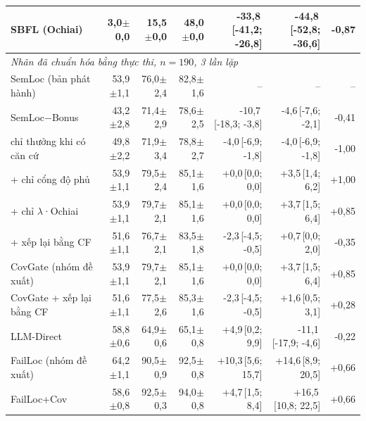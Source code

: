 \begin{tabular}{lrrrrrr}
SBFL (Ochiai) & 3,0{\scriptsize$\pm$0,0} & 15,5{\scriptsize$\pm$0,0} & 48,0{\scriptsize$\pm$0,0} & -33,8{\scriptsize\,[-41,2; -26,8]} & -44,8{\scriptsize\,[-52,8; -36,6]} & -0,87 \\
\midrule
\multicolumn{7}{l}{\emph{Nhãn đã chuẩn hóa bằng thực thi, $n=190$, 3 lần lặp}} \\
SemLoc (bản phát hành) & 53,9{\scriptsize$\pm$1,1} & 76,0{\scriptsize$\pm$2,4} & 82,8{\scriptsize$\pm$1,6} & -- & -- & -- \\
SemLoc−Bonus & 43,2{\scriptsize$\pm$2,8} & 71,4{\scriptsize$\pm$2,9} & 78,6{\scriptsize$\pm$2,5} & -10,7{\scriptsize\,[-18,3; -3,8]} & -4,6{\scriptsize\,[-7,6; -2,1]} & -0,41 \\
\quad chỉ thưởng khi có căn cứ & 49,8{\scriptsize$\pm$2,2} & 71,9{\scriptsize$\pm$3,4} & 78,8{\scriptsize$\pm$2,7} & -4,0{\scriptsize\,[-6,9; -1,8]} & -4,0{\scriptsize\,[-6,9; -1,8]} & -1,00 \\
\quad + chỉ cổng độ phủ & 53,9{\scriptsize$\pm$1,1} & 79,5{\scriptsize$\pm$2,4} & 85,1{\scriptsize$\pm$1,6} & +0,0{\scriptsize\,[0,0; 0,0]} & +3,5{\scriptsize\,[1,4; 6,2]} & +1,00 \\
\quad + chỉ $\lambda$·Ochiai & 53,9{\scriptsize$\pm$1,1} & 79,7{\scriptsize$\pm$2,1} & 85,1{\scriptsize$\pm$1,6} & +0,0{\scriptsize\,[0,0; 0,0]} & +3,7{\scriptsize\,[1,5; 6,4]} & +0,85 \\
\quad + xếp lại bằng CF & 51,6{\scriptsize$\pm$1,1} & 76,7{\scriptsize$\pm$2,1} & 83,5{\scriptsize$\pm$1,8} & -2,3{\scriptsize\,[-4,5; -0,5]} & +0,7{\scriptsize\,[0,0; 2,0]} & -0,35 \\
CovGate (nhóm đề xuất) & 53,9{\scriptsize$\pm$1,1} & 79,7{\scriptsize$\pm$2,1} & 85,1{\scriptsize$\pm$1,6} & +0,0{\scriptsize\,[0,0; 0,0]} & +3,7{\scriptsize\,[1,5; 6,4]} & +0,85 \\
CovGate + xếp lại bằng CF & 51,6{\scriptsize$\pm$1,1} & 77,5{\scriptsize$\pm$2,6} & 85,3{\scriptsize$\pm$1,6} & -2,3{\scriptsize\,[-4,5; -0,5]} & +1,6{\scriptsize\,[0,5; 3,1]} & +0,28 \\
LLM-Direct & 58,8{\scriptsize$\pm$0,6} & 64,9{\scriptsize$\pm$0,6} & 65,1{\scriptsize$\pm$0,8} & +4,9{\scriptsize\,[0,2; 9,9]} & -11,1{\scriptsize\,[-17,9; -4,6]} & -0,22 \\
FailLoc (nhóm đề xuất) & 64,2{\scriptsize$\pm$1,1} & 90,5{\scriptsize$\pm$0,9} & 92,5{\scriptsize$\pm$0,8} & +10,3{\scriptsize\,[5,6; 15,7]} & +14,6{\scriptsize\,[8,9; 20,5]} & +0,66 \\
FailLoc+Cov & 58,6{\scriptsize$\pm$0,8} & 92,5{\scriptsize$\pm$0,3} & 94,0{\scriptsize$\pm$0,8} & +4,7{\scriptsize\,[1,5; 8,4]} & +16,5{\scriptsize\,[10,8; 22,5]} & +0,66 \\

\end{tabular}
